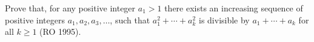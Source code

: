 Prove that, for any positive integer $a_1 > 1$ there exists an increasing sequence of positive integers $a_1, a_2, a_3, \ldots$, such that $a_1^2 + \cdots + a_k^2$ is divisible by $a_1 + \cdots + a_k$ for all $k \geq 1$ (RO 1995).
